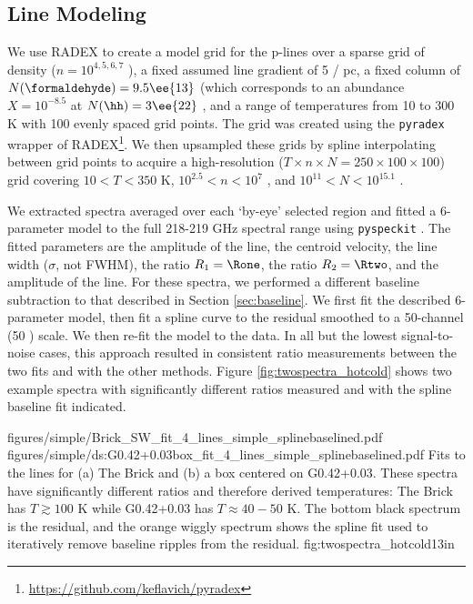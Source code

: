 \subsection{Line Modeling}
\label{sec:linemodeling}
We use RADEX \citet{van-Der-Tak2007a} to create a model grid for the
p-\formaldehyde lines over a sparse grid of density ($n=10^{4,5,6,7}$ \percc),
a fixed assumed line gradient of 5 \kms / pc, a fixed column of \formaldehyde
$N(\formaldehyde) = 9.5\ee{13}$ \persc (which corresponds to an abundance
$X=10^{-8.5}$ at $N(\hh) = 3\ee{22}$ \persc, and a range of temperatures from
10 to 300 K with 100 evenly spaced grid points.  The grid was created using
the \texttt{pyradex} wrapper of
RADEX\footnote{\url{https://github.com/keflavich/pyradex}}.
We then upsampled these grids by spline interpolating between grid points to
acquire a high-resolution ($T\times n \times N = 250\times100\times100$) grid
covering $10<T<350$ K, $10^{2.5} < n < 10^7$ \percc, and $10^{11} < N <
10^{15.1}$ \persc\perkmspc.

We extracted spectra averaged over each `by-eye' selected region and fitted
a 6-parameter model to the full 218-219 GHz spectral range using
\texttt{pyspeckit} \citep{Ginsburg2011c}.  The fitted parameters are the amplitude of the
\formaldehyde \threeohthree line, the centroid velocity, the line width
($\sigma$, not FWHM), the ratio $R_1 = \Rone$, the ratio $R_2 = \Rtwo$, and the
amplitude of the \methanol \fourtwotwo line.  For these spectra, we performed
a different baseline subtraction to that described in Section
\ref{sec:baseline}.  We first fit the described 6-parameter model, then fit a
spline curve to the residual smoothed to a 50-channel (50 \kms) scale.  We then
re-fit the model to the data.  In all but the lowest signal-to-noise cases,
this approach resulted in consistent ratio measurements between the two fits
and with the other methods.  Figure \ref{fig:twospectra_hotcold} shows two example
spectra with significantly different ratios measured and with the spline baseline
fit indicated.

\FigureTwo
{figures/simple/Brick_SW_fit_4_lines_simple_splinebaselined.pdf}
{figures/simple/ds:G0.42+0.03box_fit_4_lines_simple_splinebaselined.pdf}
{
Fits to the \para lines for (a) The Brick and (b) a box centered on G0.42+0.03.
These spectra have significantly different ratios and therefore derived temperatures:
The Brick has $T\gtrsim100$ K while G0.42+0.03 has $T\approx40-50$ K.
The bottom black spectrum is the residual, and the orange wiggly spectrum shows
the spline fit used to iteratively remove baseline ripples from the residual.}
{fig:twospectra_hotcold}{1}{3in}


